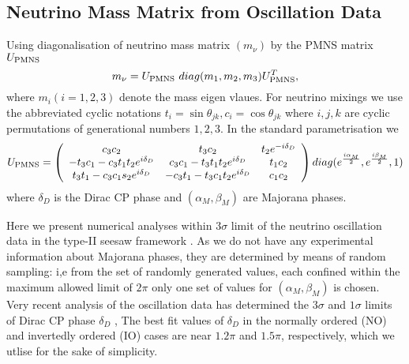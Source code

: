 \documentclass[a4paper,11pt]{article}
\begin{document}
\subsection{ Neutrino Mass Matrix from Oscillation Data}
Using diagonalisation of neutrino mass matrix $(m_\nu)$ by the PMNS matrix $U_{\rm PMNS}$
\begin{equation}
m_\nu = U_{\rm PMNS}~diag(m_1, m_2, m_3) U_{\rm PMNS}^T ,\label{mnu}
\end{equation}
where $m_i (i=1,2,3)$ denote the mass eigen vlaues. For neutrino mixings we use the abbreviated cyclic notations $t_i=\sin\theta_{jk},c_i=\cos\theta_{jk}$ where $i,j,k$ are cyclic permutations of generational numbers $1,2,3$.
In the standard parametrisation  we \cite{PDG:2012,PDG:2014,PDG:2016}
\begin{equation}
 U_{\rm PMNS}= \left( \begin{array}{ccc} c_{3} c_{2}&
                      t_{3} c_{2}&
                      t_{2} e^{-i\delta_D}\cr
-t_{3} c_{1}-c_{3} t_{1} t_{2} e^{i\delta_D}& c_{3} c_{1}-
t_{3} t_{1} t_{2} e^{i\delta_D}&
t_{1} c_{2}\cr
t_{3} t_{1} -c_{3} c_{1} s_{2} e^{i\delta_D}&
-c_{3} t_{1} -t_{3} c_{1} t_{2} e^{i\delta_D}&
c_{1} c_{2}\cr
\end{array}\right) 
diag(e^{\frac{i \alpha_M}{2}},e^{\frac{i \beta_M}{2}},1)
\end{equation}
where  $\delta_D$ is the Dirac CP phase and $(\alpha_M,\beta_M)$ are Majorana phases. 

Here we present numerical analyses within $3\sigma$ 
limit of the neutrino oscillation data in the  type-II seesaw framework \cite{scp:2018}. As we do not have any experimental information 
about Majorana phases, they are determined by means of random
sampling: i,e  from the set of randomly generated values, each
confined within the maximum allowed limit of $2\pi$  only one set of
values for  $(\alpha_M,\beta_M)$ is chosen.
Very recent analysis of the oscillation data has determined
the  $3\sigma$  and $1\sigma$ 
limits of Dirac CP phase $\delta_D$ \cite{Salas:2017},
 The best fit values 
of $\delta_D$ in the normally ordered (NO) and invertedly ordered (IO) cases are near $1.2\pi$ and $1.5\pi$, respectively, which we utlise for the sake of simplicity.
\end{document}
